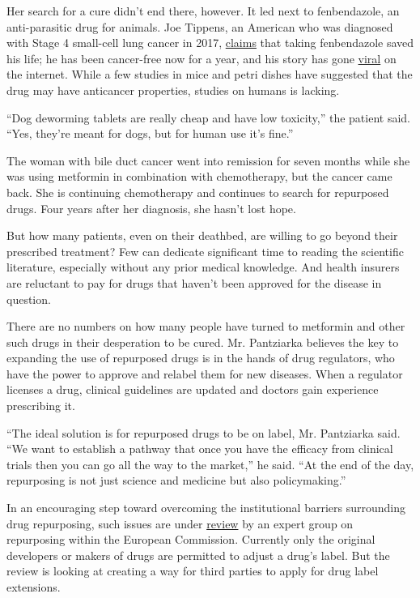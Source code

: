 Her search for a cure didn't end there, however. It led next to
fenbendazole, an anti-parasitic drug for animals. Joe Tippens, an
American who was diagnosed with Stage 4 small-cell lung cancer in 2017,
\href{https://www.mycancerstory.rocks/single-post/2016/08/22/Shake-up-your-life-how-to-change-your-own-perspective}{claims}
that taking fenbendazole saved his life; he has been cancer-free now for
a year, and his story has gone
\href{https://www.msn.com/en-ae/lifestyle/wellbeing/man-claims-drug-for-dogs-cured-him-of-cancer/ar-AAB50rx?li=BBqrPye}{viral}
on the internet. While a few studies in mice and petri dishes have
suggested that the drug may have anticancer properties, studies on
humans is lacking.

``Dog deworming tablets are really cheap and have low toxicity,'' the
patient said. ``Yes, they're meant for dogs, but for human use it's
fine.''

The woman with bile duct cancer went into remission for seven months
while she was using metformin in combination with chemotherapy, but the
cancer came back. She is continuing chemotherapy and continues to search
for repurposed drugs. Four years after her diagnosis, she hasn't lost
hope.

But how many patients, even on their deathbed, are willing to go beyond
their prescribed treatment? Few can dedicate significant time to reading
the scientific literature, especially without any prior medical
knowledge. And health insurers are reluctant to pay for drugs that
haven't been approved for the disease in question.

There are no numbers on how many people have turned to metformin and
other such drugs in their desperation to be cured. Mr. Pantziarka
believes the key to expanding the use of repurposed drugs is in the
hands of drug regulators, who have the power to approve and relabel them
for new diseases. When a regulator licenses a drug, clinical guidelines
are updated and doctors gain experience prescribing it.

``The ideal solution is for repurposed drugs to be on label, Mr.
Pantziarka said. ``We want to establish a pathway that once you have the
efficacy from clinical trials then you can go all the way to the
market,'' he said. ``At the end of the day, repurposing is not just
science and medicine but also policymaking.''

In an encouraging step toward overcoming the institutional barriers
surrounding drug repurposing, such issues are under
\href{https://ec.europa.eu/health/sites/health/files/files/committee/stamp/stamp_8_repurposing_established_medicines_background.pdf}{review}
by an expert group on repurposing within the European Commission.
Currently only the original developers or makers of drugs are permitted
to adjust a drug's label. But the review is looking at creating a way
for third parties to apply for drug label extensions.

